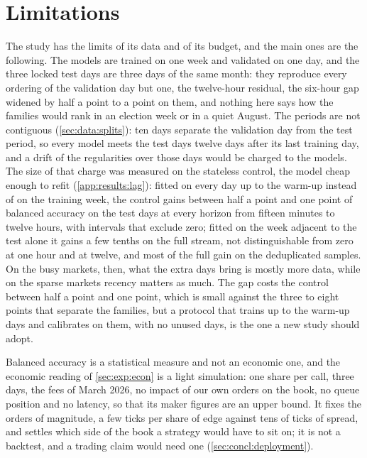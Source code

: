 \section{Limitations}
\label{sec:concl:limits}

The study has the limits of its data and of its budget, and the main ones are the
following.  The models are trained on one week and validated on one day, and the three
locked test days are three days of the same month: they reproduce every ordering of the
validation day but one, the twelve-hour residual, the six-hour gap widened by half a point
to a point on them, and nothing
here says how the families would rank in an election week or in a quiet August.  The
periods are not contiguous (\cref{sec:data:splits}): ten days separate the validation day
from the test period, so every model meets the test days twelve days after its last training
day, and a drift of the regularities over those days would be charged to the models.  The
size of that charge was measured on the stateless control, the model cheap enough to refit
(\cref{app:results:lag}): fitted on every day up to the warm-up instead of on the training
week, the control gains between half a point and one point of balanced accuracy on the test
days at every horizon from fifteen minutes to twelve hours, with intervals that exclude zero; fitted on the week adjacent to the
test alone it gains a few tenths on the full stream, not distinguishable from zero at one
hour and at twelve, and most of the full gain on the deduplicated samples.  On the busy
markets, then, what the extra days bring is mostly more data, while on the sparse markets
recency matters as much.  The gap costs the control between half a point and one point,
which is small against the three to eight points that separate the families, but a protocol
that trains up to the warm-up days and calibrates on them, with no unused days, is the one a
new study should adopt.

Balanced accuracy is a statistical measure and not an economic one, and the economic
reading of \cref{sec:exp:econ} is a light simulation: one share per call, three days, the fees
of March 2026, no impact of our own orders on the book, no queue position and no latency, so
that its maker figures are an upper bound.  It fixes the orders of magnitude, a few ticks per
share of edge against tens of ticks of spread, and settles which side of the book a strategy
would have to sit on; it is not a backtest, and a trading claim would need one
(\cref{sec:concl:deployment}).

